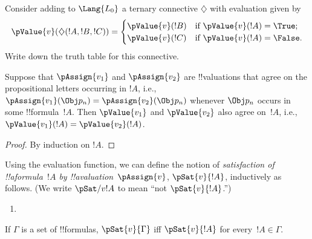 \documentclass[../../../include/open-logic-section]{subfiles}
\begin{document}
\begin{prob}
Consider adding to $\Lang{L_0}$ a ternary connective $\diamondsuit$ 
with evaluation given by 
\begin{gather*}
  \pValue{v}(\diamondsuit( !A , !B , !C ) ) = \begin{cases} 
    \pValue{v}( !B ) &
    \text{if $\pValue{v}(!A) = \True$;}\\
    \pValue{v}( !C ) &
    \text{if $\pValue{v}(!A) = \False $}.
  \end{cases}
\end{gather*}
Write down the truth table for this connective.
\end{prob}

\begin{thm}  
 Suppose that $\pAssign{v_1}$ and
$\pAssign{v_2}$ are !!{valuation}s that agree on the propositional
letters occurring in $!A$, i.e., $\pAssign{v_1}(\Obj p_n) =
\pAssign{v_2}(\Obj p_n)$ whenever $\Obj p_n$ occurs in some !!{formula}~$!A$. Then $\pValue{v_1}$ and $\pValue{v_2}$ also agree on~$!A$, i.e., $\pValue{v_1}(!A) = \pValue{v_2}(!A)$.
\end{thm}

\begin{proof} 
By induction on $!A$. 
\end{proof}

\begin{defn}[Satisfaction]
 Using the evaluation function, we can
define the notion of \emph{satisfaction of !!a{formula}~$!A$ by
  !!a{valuation}~$\pAssign{v}$}, $\pSat{v}{!A}$, inductively as
  follows. (We write $\pSat/{v}{!A}$ to mean ``not
  $\pSat{v}{!A}$.'')
\begin{enumerate}


\item {}





\end{enumerate}
If $\Gamma$ is a set of !!{formula}s, $\pSat{v}{\Gamma}$ iff
$\pSat{v}{!A}$ for every~$!A \in \Gamma$.
\end{defn}
\end{document}
